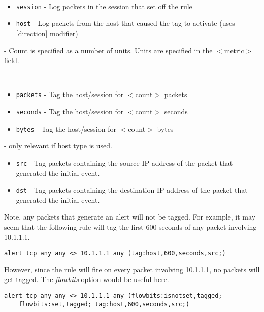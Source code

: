 \documentclass[english]{report}
\begin{document}
\begin{description}{}
  \item [\texttt{type}]~
     \begin{itemize}{}
     \item \texttt{session} - Log packets in the session that set off the rule 
     \item \texttt{host} - Log packets from the host that caused the tag to activate (uses {[}direction{]} modifier)
     \end{itemize}
  \item [\texttt{count}] - Count is specified as a number of units. Units are specified in the $<$metric$>$ field.
  \item [\texttt{metric}]~
  \begin{itemize}{}
      \item \texttt{packets} - Tag the host/session for $<$count$>$ packets 
      \item \texttt{seconds} - Tag the host/session for $<$count$>$ seconds
      \item \texttt{bytes}   - Tag the host/session for $<$count$>$ bytes
   \end{itemize}
  \item [\texttt{direction}] - only relevant if host type is used.
  \begin{itemize}{}
       \item \texttt{src} - Tag packets containing the source IP address of the packet that generated the initial event.
       \item \texttt{dst} - Tag packets containing the destination IP address of the packet that generated the initial event.
  \end{itemize}
\end{description}

Note, any packets that generate an alert will not be tagged.  For example, it may seem that the following rule will tag the first 600 seconds of any packet involving 10.1.1.1.
\begin{verbatim}
alert tcp any any <> 10.1.1.1 any (tag:host,600,seconds,src;)
\end{verbatim}

However, since the rule will fire on every packet involving 10.1.1.1, no packets will get tagged.  The \emph{flowbits} option would be useful here.

\begin{verbatim}
alert tcp any any <> 10.1.1.1 any (flowbits:isnotset,tagged; 
    flowbits:set,tagged; tag:host,600,seconds,src;)
\end{verbatim}
\end{document}
